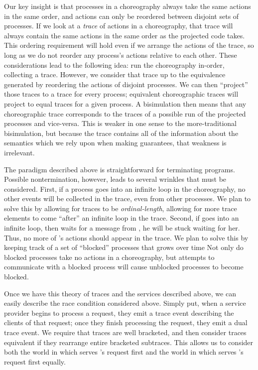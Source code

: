 Our key insight is that processes in a choreography always take the same actions in the same order, and actions can only be reordered between disjoint sets of processes.
If we look at a \emph{trace} of actions in a choreography, that trace will always contain the same actions in the same order as the projected code takes.
This ordering requirement will hold even if we arrange the actions of the trace, so long as we do not reorder any process's actions relative to each other.
These considerations lead to the following idea: run the choreography in-order, collecting a trace.
However, we consider that trace up to the equivalence generated by reordering the actions of disjoint processes.
We can then ``project'' those traces to a trace for every process; equivalent choreographic traces will project to equal traces for a given process.
A bisimulation then means that any choreographic trace corresponds to the traces of a possible run of the projected processes and vice-versa.
This is weaker in one sense to the more-traditional bisimulation, but because the trace contains all of the information about the semantics which we rely upon when making guarantees, that weakness is irrelevant.

The paradigm described above is straightforward for terminating programs.
Possible nontermination, however, leads to several wrinkles that must be considered.
First, if a process goes into an infinite loop in the choreography, no other events will be collected in the trace, even from other processes.
We plan to solve this by allowing for traces to be \emph{ordinal-length}, allowing for more trace elements to come ``after'' an infinite loop in the trace.
Second, if \Alice{} goes into an infinite loop, then \Bob{} waits for a message from \Alice, he will be stuck waiting for her.
Thus, no more of \Bob{}'s actions should appear in the trace.
We plan to solve this by keeping track of a set of ``blocked'' processes that grows over time
Not only do blocked processes take no actions in a choreography, but attempts to communicate with a blocked process will cause unblocked processes to become blocked.

Once we have this theory of traces and the services described above, we can easily describe the race condition considered above.
Simply put, when a service provider begins to process a request, they emit a trace event describing the clients of that request; once they finish processing the request, they emit a dual trace event.
We require that traces are well bracketed, and then consider traces equivalent if they rearrange entire bracketed subtraces.
This allows us to consider both the world in which \Alice{} serves \Bob{}'s request first and the world in which \Alice{} serves \Cathy{}'s request first equally.


